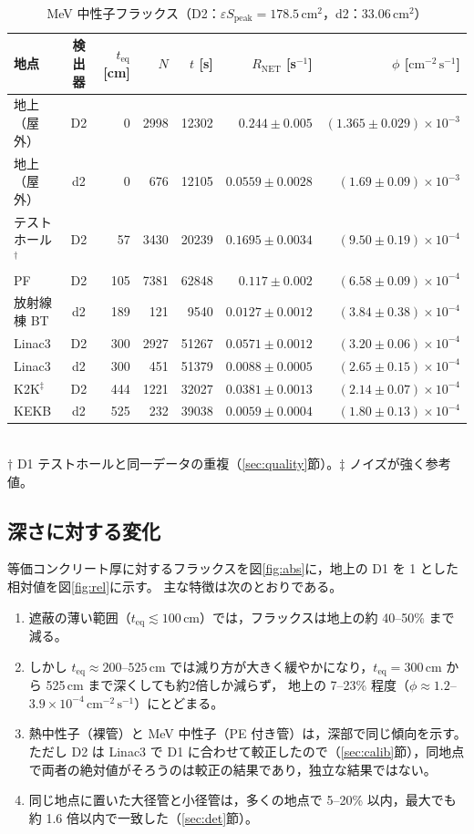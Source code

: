 \documentclass[a4paper,11pt]{ltjsarticle}
\newcommand{\teq}{t_{\mathrm{eq}}}
\newcommand{\RNET}{R_{\mathrm{NET}}}
\newcommand{\eSpk}{\varepsilon S_{\mathrm{peak}}}
\newcommand{\flux}{\mathrm{cm^{-2}\,s^{-1}}}
\begin{document}
\begin{table}[htbp]
  \centering
  \caption{MeV 中性子フラックス（D2：$\eSpk=178.5$\,cm$^2$，d2：33.06\,cm$^2$）}
  \label{tab:mev}
  \small
  \begin{tabular}{lcrrrrr}
    \toprule
    地点 & 検出器 & $\teq$ [cm] & $N$ & $t$ [s] & $\RNET$ [s$^{-1}$] & $\phi$ [$\flux$] \\
    \midrule
    地上（屋外） & D2 & 0   & 2998 & 12302 & $0.244\pm0.005$ & $(1.365\pm0.029)\times10^{-3}$ \\
    地上（屋外） & d2 & 0   & 676  & 12105 & $0.0559\pm0.0028$ & $(1.69\pm0.09)\times10^{-3}$ \\
    テストホール$^{\dagger}$ & D2 & 57 & 3430 & 20239 & $0.1695\pm0.0034$ & $(9.50\pm0.19)\times10^{-4}$ \\
    PF          & D2 & 105 & 7381 & 62848 & $0.117\pm0.002$ & $(6.58\pm0.09)\times10^{-4}$ \\
    放射線棟 BT  & d2 & 189 & 121  & 9540  & $0.0127\pm0.0012$ & $(3.84\pm0.38)\times10^{-4}$ \\
    Linac3      & D2 & 300 & 2927 & 51267 & $0.0571\pm0.0012$ & $(3.20\pm0.06)\times10^{-4}$ \\
    Linac3      & d2 & 300 & 451  & 51379 & $0.0088\pm0.0005$ & $(2.65\pm0.15)\times10^{-4}$ \\
    K2K$^{\ddagger}$ & D2 & 444 & 1221 & 32027 & $0.0381\pm0.0013$ & $(2.14\pm0.07)\times10^{-4}$ \\
    KEKB        & d2 & 525 & 232  & 39038 & $0.0059\pm0.0004$ & $(1.80\pm0.13)\times10^{-4}$ \\
    \bottomrule
  \end{tabular}\\[2pt]
  \footnotesize $\dagger$ D1 テストホールと同一データの重複（\ref{sec:quality}節）。\quad $\ddagger$ ノイズが強く参考値。
\end{table}

\subsection{深さに対する変化}

等価コンクリート厚に対するフラックスを図\ref{fig:abs}に，地上の D1 を 1 とした相対値を図\ref{fig:rel}に示す。
主な特徴は次のとおりである。

\begin{enumerate}
  \item 遮蔽の薄い範囲（$\teq\lesssim100$\,cm）では，フラックスは地上の約 40--50\% まで減る。
  \item しかし $\teq\approx200$--$525$\,cm では減り方が大きく緩やかになり，$\teq=300$\,cm から 525\,cm まで深くしても約2倍しか減らず，
  地上の 7--23\% 程度（$\phi\approx1.2$--$3.9\times10^{-4}\,\flux$）にとどまる。
  \item 熱中性子（裸管）と MeV 中性子（PE 付き管）は，深部で同じ傾向を示す。
  ただし D2 は Linac3 で D1 に合わせて較正したので（\ref{sec:calib}節），同地点で両者の絶対値がそろうのは較正の結果であり，独立な結果ではない。
  \item 同じ地点に置いた大径管と小径管は，多くの地点で 5--20\% 以内，最大でも約 1.6 倍以内で一致した（\ref{sec:det}節）。
\end{enumerate}
\end{document}
